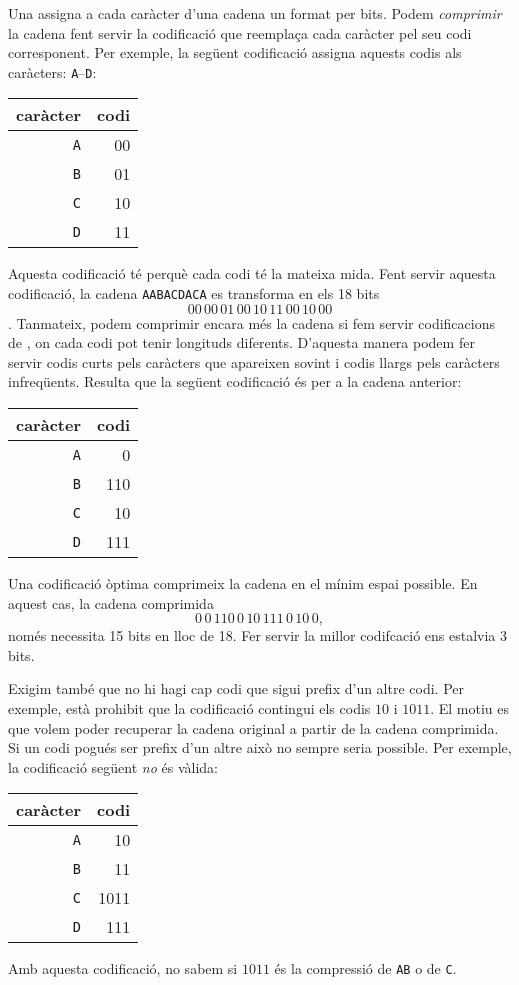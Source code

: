 
Una  assigna a cada caràcter
d'una cadena un  format per bits.
Podem \emph{comprimir} la cadena fent servir la codificació
que reemplaça cada caràcter pel
seu codi corresponent.
Per exemple, la següent codificació assigna aquests
codis als caràcters:
\texttt{A}–\texttt{D}:
\begin{center}
\begin{tabular}{rr}
caràcter & codi \\
\hline
\texttt{A} & 00 \\
\texttt{B} & 01 \\
\texttt{C} & 10 \\
\texttt{D} & 11 \\
\end{tabular}
\end{center}
Aquesta codificació té 
perquè cada codi té la mateixa mida.
Fent servir aquesta codificació, la cadena
\texttt{AABACDACA} es transforma en els 18 bits 
\[00\,00\,01\,00\,10\,11\,00\,10\,00\].
Tanmateix, podem comprimir encara més la cadena
si fem servir codificacions de , on
cada codi pot tenir longituds diferents.
D'aquesta manera podem fer servir codis curts pels caràcters que
apareixen sovint i codis llargs pels caràcters infreqüents.
Resulta que la següent codificació és 
per a la cadena anterior:
\begin{center}
\begin{tabular}{rr}
caràcter & codi \\
\hline
\texttt{A} & 0 \\
\texttt{B} & 110 \\
\texttt{C} & 10 \\
\texttt{D} & 111 \\
\end{tabular}
\end{center}
Una codificació òptima comprimeix la cadena en el mínim
espai possible.
En aquest cas, la cadena comprimida
\[0\,0\,110\,0\,10\,111\,0\,10\,0,\]
només necessita 15 bits en lloc de 18. Fer servir la millor
codifcació ens estalvia 3 bits.

Exigim també que no hi hagi cap codi que sigui
prefix d'un altre codi.
Per exemple, està prohibit que la codificació
contingui els codis $10$ i $1011$.
El motiu es que volem
poder recuperar la cadena original
a partir de la cadena comprimida.
Si un codi pogués ser prefix d'un altre
això no sempre seria possible.
Per exemple, la codificació següent \emph{no} és vàlida:
\begin{center}
\begin{tabular}{rr}
caràcter & codi \\
\hline
\texttt{A} & 10 \\
\texttt{B} & 11 \\
\texttt{C} & 1011 \\
\texttt{D} & 111 \\
\end{tabular}
\end{center}
Amb aquesta codificació, no sabem si $1011$ és la compressió
de \texttt{AB} o de \texttt{C}.

